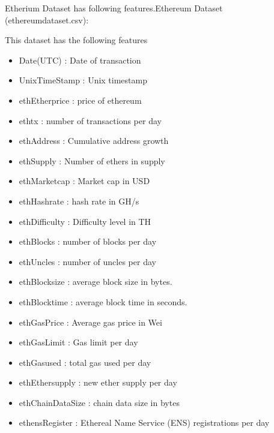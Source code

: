 \documentclass{article}
\begin{document}
Etherium Dataset has following features.Ethereum Dataset (ethereum\textunderscore dataset.csv):

This dataset has the following features
\begin{itemize}

\item Date(UTC) : Date of transaction

\item UnixTimeStamp : Unix timestamp

\item eth\textunderscore Etherprice : price of ethereum

\item eth\textunderscore tx : number of transactions per day

\item eth\textunderscore Address : Cumulative address growth

\item eth\textunderscore Supply : Number of ethers in supply

\item eth\textunderscore Marketcap : Market cap in USD

\item eth\textunderscore Hashrate : hash rate in GH/s

\item eth\textunderscore Difficulty : Difficulty level in TH

\item eth\textunderscore Blocks : number of blocks per day

\item eth\textunderscore Uncles : number of uncles per day

\item eth\textunderscore Blocksize : average block size in bytes.

\item eth\textunderscore Blocktime : average block time in seconds.

\item eth\textunderscore GasPrice : Average gas price in Wei

\item eth\textunderscore GasLimit : Gas limit per day

\item eth\textunderscore Gasused : total gas used per day

\item eth\textunderscore Ethersupply : new ether supply per day

\item eth\textunderscore ChainDataSize : chain data size in bytes

\item eth\textunderscore ens\textunderscore Register : Ethereal Name Service (ENS) registrations per day

\end{itemize}
\end{document}

